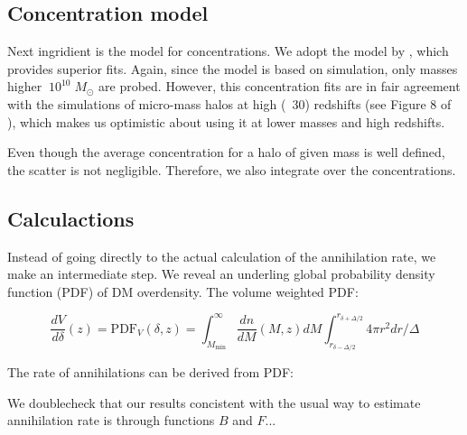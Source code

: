 \subsection{Concentration model}

Next ingridient is the model for concentrations. We adopt the model by \cite{2014arXiv1407.4730D}, which provides superior fits. Again, since the model is based on simulation, only masses higher $~10^{10}\;M_\odot$ are probed. However, this concentration fits are in fair agreement with the simulations of micro-mass halos at high (~30) redshifts (see Figure 8 of \cite{2014arXiv1407.4730D}), which makes us optimistic about using it at lower masses and high redshifts.

Even though the average concentration for a halo of given mass is well defined, the scatter is not negligible. Therefore, we also integrate over the concentrations.



\subsection{Calculactions}

Instead of going directly to the actual calculation of the annihilation rate, we make an intermediate step. We reveal an underling global probability density function (PDF) of DM overdensity. The volume weighted PDF:

\begin{equation}
\dfrac{dV}{d\delta}(z)=\mathrm{PDF}_V (\delta, z) = \int_{M_\mathrm{min}}^\infty \dfrac{dn}{dM}(M,z) dM \int_{r_{\delta-\Delta/2}}^{r_{\delta+\Delta/2}} 4\pi r^2 dr / \Delta
\end{equation}

The rate of annihilations can be derived from PDF:



We doublecheck that our results concistent with the usual way to estimate annihilation rate is through functions $B$ and $F$...

